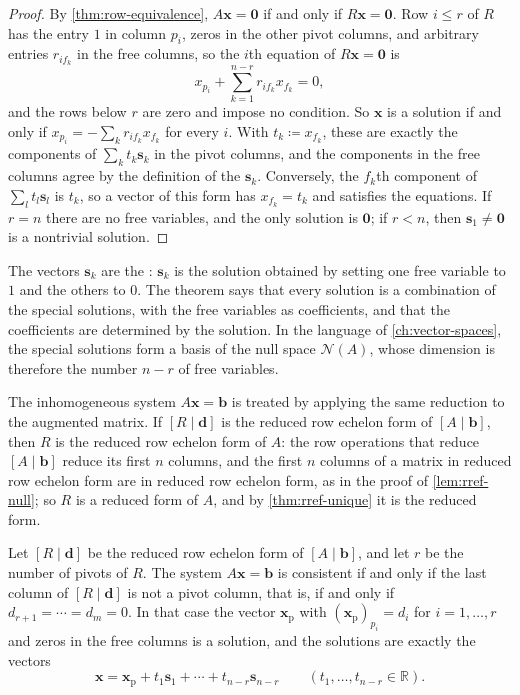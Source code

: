 \begin{proof}
By \cref{thm:row-equivalence}, $A\mathbf x=\mathbf 0$ if and only if $R\mathbf x=\mathbf 0$. Row $i\le r$ of $R$ has the entry $1$ in column $p_i$, zeros in the other pivot columns, and arbitrary entries $r_{if_k}$ in the free columns, so the $i$th equation of $R\mathbf x=\mathbf 0$ is
\[
x_{p_i}+\sum_{k=1}^{n-r}r_{if_k}x_{f_k}=0,
\]
and the rows below $r$ are zero and impose no condition. So $\mathbf x$ is a solution if and only if $x_{p_i}=-\sum_kr_{if_k}x_{f_k}$ for every $i$. With $t_k\coloneqq x_{f_k}$, these are exactly the components of $\sum_kt_k\mathbf s_k$ in the pivot columns, and the components in the free columns agree by the definition of the $\mathbf s_k$. Conversely, the $f_k$th component of $\sum_lt_l\mathbf s_l$ is $t_k$, so a vector of this form has $x_{f_k}=t_k$ and satisfies the equations. If $r=n$ there are no free variables, and the only solution is $\mathbf 0$; if $r<n$, then $\mathbf s_1\ne\mathbf 0$ is a nontrivial solution.
\end{proof}

The vectors $\mathbf s_k$ are the : $\mathbf s_k$ is the solution obtained by setting one free variable to $1$ and the others to $0$. The theorem says that every solution is a combination of the special solutions, with the free variables as coefficients, and that the coefficients are determined by the solution. In the language of \cref{ch:vector-spaces}, the special solutions form a basis of the null space $\mathcal N(A)$, whose dimension is therefore the number $n-r$ of free variables.

The inhomogeneous system $A\mathbf x=\mathbf b$ is treated by applying the same reduction to the augmented matrix. If $[R\mid\mathbf d]$ is the reduced row echelon form of $[A\mid\mathbf b]$, then $R$ is the reduced row echelon form of $A$: the row operations that reduce $[A\mid\mathbf b]$ reduce its first $n$ columns, and the first $n$ columns of a matrix in reduced row echelon form are in reduced row echelon form, as in the proof of \cref{lem:rref-null}; so $R$ is a reduced form of $A$, and by \cref{thm:rref-unique} it is the reduced form.

\begin{theorem}[Solvability]
\label{thm:solvability}
Let $[R\mid\mathbf d]$ be the reduced row echelon form of $[A\mid\mathbf b]$, and let $r$ be the number of pivots of $R$. The system $A\mathbf x=\mathbf b$ is consistent if and only if the last column of $[R\mid\mathbf d]$ is not a pivot column, that is, if and only if $d_{r+1}=\cdots=d_m=0$. In that case the vector $\mathbf x_{\mathrm p}$ with $(\mathbf x_{\mathrm p})_{p_i}=d_i$ for $i=1,\ldots,r$ and zeros in the free columns is a solution, and the solutions are exactly the vectors
\[
\mathbf x=\mathbf x_{\mathrm p}+t_1\mathbf s_1+\cdots+t_{n-r}\mathbf s_{n-r}\qquad(t_1,\ldots,t_{n-r}\in\mathbb R).
\]
\end{theorem}

